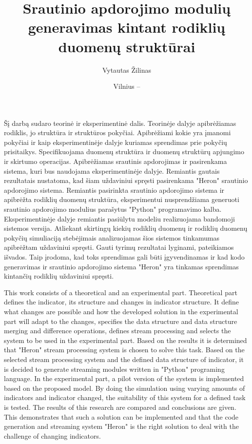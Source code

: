 \documentclass{VUMIFPSbakalaurinis}
\title{Srautinio apdorojimo modulių generavimas kintant rodiklių duomenų struktūrai}
\author{Vytautas Žilinas}
\date{Vilnius – \the\year}
\begin{document}
 
\maketitle

\cleardoublepage{}
\setcounter{page}{2}

Šį darbą sudaro teorinė ir eksperimentinė dalis. Teorinėje dalyje apibrėžiamas rodiklis, jo struktūra ir struktūros pokyčiai. Apibrėžiami kokie yra įmanomi pokyčiai ir kaip eksperimentinėje dalyje kuriamas sprendimas prie pokyčių prisitaikys. Specifikuojama duomenų struktūra ir duomenų struktūrų apjungimo ir skirtumo operacijas. Apibrėžiamas srautinis apdorojimas ir pasirenkama sistema, kuri bus naudojama eksperimentinėje dalyje. Remiantis gautais rezultatais
nustatoma, kad šiam uždaviniui spręsti pasirenkama "Heron" srautinio apdorojimo sistema. Remiantis pasirinkta srautinio apdorojimo sistema ir apibrėžta rodiklių duomenų struktūra, eksperimentui nusprendžiama generuoti srautinio apdorojimo modulius parašytus "Python" programavimo kalba. Eksperimentinėje dalyje remiantis pasiūlytu modeliu realizuojama bandomoji sistemos versija. Atliekant skirtingų kiekių rodiklių duomenų ir rodiklių duomenų pokyčių simuliaciją stebėjimais analizuojamas šios sistemos tinkamumas apibrėžtam uždaviniui spręsti. Gauti tyrimų rezultatai lyginami, pateikiamos išvados. Taip įrodoma, kad toks sprendimas gali būti įgyvendinamas ir kad kodo generavimas ir srautinio apdorojimo sistema "Heron" yra tinkamas sprendimas kintančių rodiklių uždaviniui spręsti.

This work consists of a theoretical and an experimental part. Theoretical part defines the indicator, its structure and changes in indicator structure. It define what changes are possible and how the developed solution in the experimental part will adapt to the changes, specifies the data structure and data structure merging and difference operations, defines stream processing and selects the system to be used in the experimental part. Based on the results
it is determined that "Heron" stream processing system is chosen to solve this task. Based on the selected stream processing system and the defined data structure of indicator, it is decided to generate streaming modules written in "Python" programing language. In the experimental part, a pilot version of the system is implemented based on the proposed model. By doing the simulation using varying amounts of indicators and indicator changed, the suitability of this system for a defined task is tested. The results of this research are compared and conclusions are given. This demonstrates that such a solution can be implemented and that the code generation and streaming system "Heron" is the right solution to deal with the challenge of changing indicators.
\end{document}
